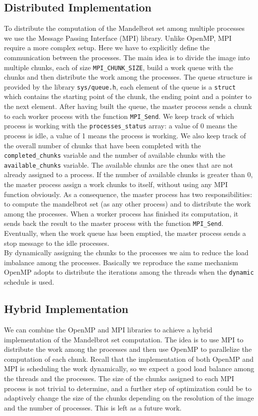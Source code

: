 \subsection{Distributed Implementation}
    To distribute the computation of the Mandelbrot set among multiple processes
    we use the Message Passing Interface (MPI) library. Unlike OpenMP, MPI require
    a more complex setup. Here we have to explicitly define the communication
    between the processes. The main idea is to divide the image into multiple
    chunks, each of size \texttt{MPI\_CHUNK\_SIZE}, build a work queue with the
    chunks and then distribute the work among the processes. The queue structure
    is provided by the library \texttt{sys/queue.h}, each element of the queue
    is a \texttt{struct} which contains the starting point of the chunk, the
    ending point and a pointer to the next element. After having built the queue,
    the master process sends a chunk to each worker process with the function
    \texttt{MPI\_Send}. We keep track of which process is working with the
    \texttt{processes\_status} array: a value of 0 means the process is idle, a
    value of 1 means the process is working. We also keep track of the overall
    number of chunks that have been completed with the \texttt{completed\_chunks}
    variable and the number of available chunks with the \texttt{available\_chunks}
    variable. The available chunks are the ones that are not already assigned 
    to a process. If the number of available chunks is greater than 0, the master
    process assign a work chunks to itself, without using any MPI function obviously.
    As a consequence, the master process has two responsibilities: to compute
    the mandelbrot set (as any other process) and to distribute the work among
    the processes. When a worker process has finished its computation, it sends
    back the result to the master process with the function \texttt{MPI\_Send}.
    Eventually, when the work queue has been emptied, the master process sends
    a stop message to the idle processes. \\
    By dynamically assigning the chunks to the processes we aim to reduce the
    load imbalance among the processes. Basically we reproduce the same mechanism
    OpenMP adopts to distribute the iterations among the threads when the 
    \texttt{dynamic} schedule is used.

\subsection{Hybrid Implementation}
    We can combine the OpenMP and MPI libraries to achieve a hybrid implementation
    of the Mandelbrot set computation. The idea is to use MPI to distribute the
    work among the processes and then use OpenMP to parallelize the computation
    of each chunk. Recall that the implementation of both OpenMP and MPI is
    scheduling the work dynamically, so we expect a good load balance among the
    threads and the processes. The size of the chunks assigned to each MPI process
    is not trivial to determine, and a further step of optimization could be
    to adaptively change the size of the chunks depending on the resolution
    of the image and the number of processes. This is left as a future work.

